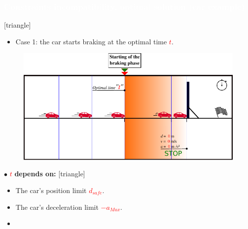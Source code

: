 \begin{frame}
\frametitle{{\textcolor{white}{\hspace{0.3cm}Constraints incompatibility, optimal solution (car example)}}}
[triangle]  
\begin{itemize}
\addtolength{\itemindent}{-4mm}
\item Case 1: the car starts braking at the optimal time \textcolor{red}{$t$}.
\end{itemize}
\begin{figure}[!ht]
\centering
\includegraphics[width=0.99\linewidth]{figures/car_example_1}
\end{figure}
\vspace{2mm}
$\bullet$  \textcolor{red}{$t$} \textbf{depends on: }
[triangle]
\begin{itemize}
\item The car's position limit \textcolor{red}{$d_{safe}$}. 
\item The car's deceleration limit \textcolor{red}{$-a_{Max}$}. 
\end{itemize}  
\vspace{1mm}
\begin{itemize}
\addtolength{\itemindent}{0mm}
\item[\hookrightarrow] 
\end{itemize}
\end{frame}







